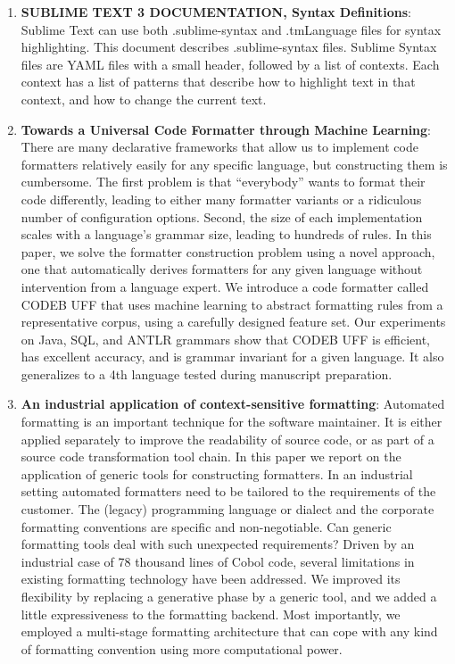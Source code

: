 \begin{englishtext}
\begin{enumerate}
    \item \textbf{SUBLIME TEXT 3 DOCUMENTATION, Syntax Definitions}: Sublime
    Text can use both .sublime-syntax and .tmLanguage files for syntax
    highlighting. This document describes .sublime-syntax files. Sublime Syntax
    files are YAML files with a small header, followed by a list of contexts.
    Each context has a list of patterns that describe how to highlight text in
    that context, and how to change the current text. \cite{Skinner}

    \item \textbf{Towards a Universal Code Formatter through Machine Learning}:
    There are many declarative frameworks that allow us to implement code
    formatters relatively easily for any specific language, but constructing
    them is cumbersome. The first problem is that “everybody” wants to format
    their code differently, leading to either many formatter variants or a
    ridiculous number of configuration options. Second, the size of each
    implementation scales with a language’s grammar size, leading to hundreds of
    rules. In this paper, we solve the formatter construction problem using a
    novel approach, one that automatically derives formatters for any given
    language without intervention from a language expert. We introduce a code
    formatter called CODEB UFF that uses machine learning to abstract formatting
    rules from a representative corpus, using a carefully designed feature set.
    Our experiments on Java, SQL, and ANTLR grammars show that CODEB UFF is
    efficient, has excellent accuracy, and is grammar invariant for a given
    language. It also generalizes to a 4th language tested during manuscript
    preparation. \cite{universalCodeFormatter}

    \item \textbf{An industrial application of context-sensitive formatting}:
    Automated formatting is an important technique for the software maintainer.
    It is either applied separately to improve the readability of source code,
    or as part of a source code transformation tool chain. In this paper we
    report on the application of generic tools for constructing formatters. In
    an industrial setting automated formatters need to be tailored to the
    requirements of the customer. The (legacy) programming language or dialect
    and the corporate formatting conventions are specific and non-negotiable.
    Can generic formatting tools deal with such unexpected requirements? Driven
    by an industrial case of 78 thousand lines of Cobol code, several
    limitations in existing formatting technology have been addressed. We
    improved its flexibility by replacing a generative phase by a generic tool,
    and we added a little expressiveness to the formatting backend. Most
    importantly, we employed a multi-stage formatting architecture that can cope
    with any kind of formatting convention using more computational power.
    \cite{industrialApplication}


\end{enumerate}
\end{englishtext}
